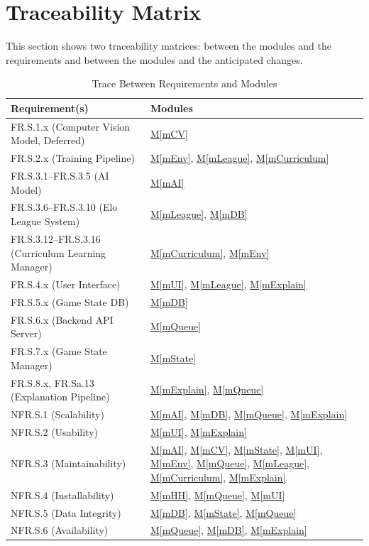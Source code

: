 \documentclass[12pt, titlepage]{article}
\newcommand{\mref}[1]{\hyperref[sec:#1]{M\ref*{#1}}}
\begin{document}
\newpage
\section{Traceability Matrix} \label{SecTM}

This section shows two traceability matrices: between the modules and the
requirements and between the modules and the anticipated changes.


\begin{table}[H]
\centering
\caption{Trace Between Requirements and Modules}
\label{TblRT}
\begin{tabularx}{\textwidth}{|l|X|}
\hline
\textbf{Requirement(s)} & \textbf{Modules}\\
\hline
FR.S.1.x (Computer Vision Model, Deferred) & \mref{mCV} \\
\hline
FR.S.2.x (Training Pipeline) & \mref{mEnv}, \mref{mLeague}, \mref{mCurriculum} \\
\hline
FR.S.3.1--FR.S.3.5 (AI Model) & \mref{mAI} \\
\hline
FR.S.3.6--FR.S.3.10 (Elo League System) & \mref{mLeague}, \mref{mDB} \\
\hline
FR.S.3.12--FR.S.3.16 (Curriculum Learning Manager) & \mref{mCurriculum}, \mref{mEnv} \\
\hline
FR.S.4.x (User Interface) & \mref{mUI}, \mref{mLeague}, \mref{mExplain} \\
\hline
FR.S.5.x (Game State DB) & \mref{mDB} \\
\hline
FR.S.6.x (Backend API Server) & \mref{mQueue} \\
\hline
FR.S.7.x (Game State Manager) & \mref{mState} \\
\hline
FR.S.8.x, FR.Sa.13 (Explanation Pipeline) & \mref{mExplain}, \mref{mQueue} \\
\hline
NFR.S.1 (Scalability) & \mref{mAI}, \mref{mDB}, \mref{mQueue}, \mref{mExplain} \\
\hline
NFR.S.2 (Usability) & \mref{mUI}, \mref{mExplain} \\
\hline
NFR.S.3 (Maintainability) & \mref{mAI}, \mref{mCV}, \mref{mState}, \mref{mUI}, \mref{mEnv}, \mref{mQueue}, \mref{mLeague}, \mref{mCurriculum}, \mref{mExplain} \\
\hline
NFR.S.4 (Installability) & \mref{mHH}, \mref{mQueue}, \mref{mUI} \\
\hline
NFR.S.5 (Data Integrity) & \mref{mDB}, \mref{mState}, \mref{mQueue} \\
\hline
NFR.S.6 (Availability) & \mref{mQueue}, \mref{mDB}, \mref{mExplain} \\

\end{tabularx}
\end{table}
\end{document}
